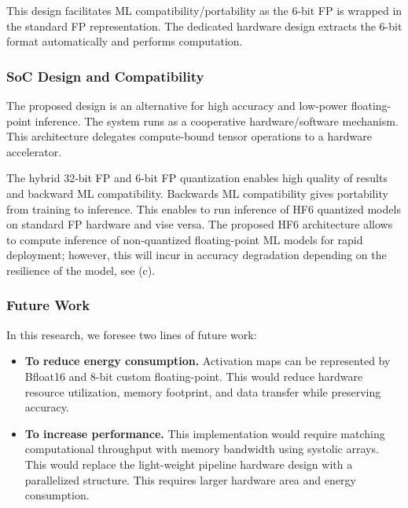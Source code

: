 This design facilitates ML compatibility/portability as the 6-bit FP is wrapped in the standard FP representation. The dedicated hardware design extracts the 6-bit format automatically and performs computation.

\subsubsection{SoC Design and Compatibility}
The proposed design is an alternative for high accuracy and low-power floating-point inference. The system runs as a cooperative hardware/software mechanism. This architecture delegates compute-bound tensor operations to a hardware accelerator.

The hybrid 32-bit FP and 6-bit FP quantization enables high quality of results and backward ML compatibility. Backwards ML compatibility gives portability from training to inference. This enables to run inference of HF6 quantized models on standard FP hardware and vise versa. The proposed HF6 architecture allows to compute inference of non-quantized floating-point ML models for rapid deployment; however, this will incur in accuracy degradation depending on the resilience of the model, see (c).

\subsubsection{Future Work}
In this research, we foresee two lines of future work:
\begin{itemize}
\item \textbf{To reduce energy consumption.} Activation maps can be represented by Bfloat16 and 8-bit custom floating-point. This would reduce hardware resource utilization, memory footprint, and data transfer while preserving accuracy.

\item \textbf{To increase performance.} This implementation would require matching computational throughput with memory bandwidth using systolic arrays. This would replace the light-weight pipeline hardware design with a parallelized structure. This requires larger hardware area and energy consumption.
\end{itemize}

